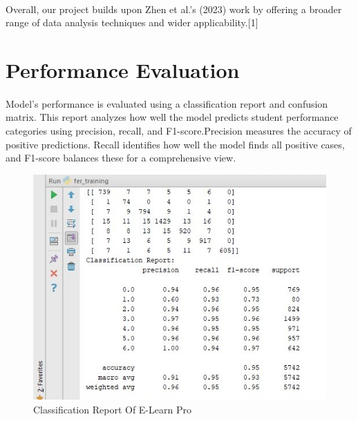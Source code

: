 \paragraph{} Overall, our project builds upon Zhen et al.'s (2023) work by offering a broader range of data analysis techniques and wider applicability.[1]

\section{Performance Evaluation}
\paragraph{} Model's performance is evaluated using a classification report and confusion matrix. This report analyzes how well the model predicts student performance categories using precision, recall, and F1-score.Precision measures the accuracy of positive predictions. Recall identifies how well the model finds all positive cases, and F1-score balances these for a comprehensive view.


\begin{figure}[!ht]
\centering
\includegraphics[width=125mm]{e learn .jpeg}
\caption{Classification Report Of E-Learn Pro}
\end{figure} 



